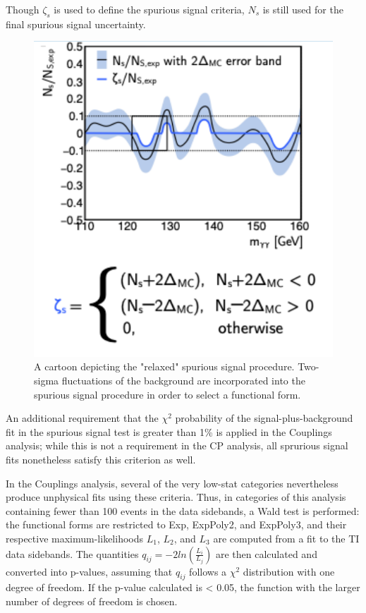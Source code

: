 Though $\zeta_{s}$ is used to define the spurious signal criteria, $N_{s}$ is still used for the final spurious signal uncertainty. 

\begin{figure}
\includegraphics[width=\linewidth]{figures/sigbkgparam/SSRelaxed.png}
\caption{A cartoon depicting the "relaxed" spurious signal procedure. Two-sigma fluctuations of the background are incorporated into the spurious signal procedure in order to select a functional form.}
\label{fig:SSrelaxed}
\end{figure} 


An additional requirement that the $\chi^{2}$ probability of the signal-plus-background fit in the spurious signal test is greater than 1\% is applied in the Couplings analysis; while this is not a requirement in the CP analysis, all sprurious signal fits nonetheless satisfy this criterion as well.

In the Couplings analysis, several of the very low-stat categories nevertheless produce unphysical fits using these criteria. Thus, in categories of this analysis containing fewer than 100 events in the data sidebands, a Wald test is performed: the functional forms are restricted to Exp, ExpPoly2, and ExpPoly3, and their respective maximum-likelihoods $L_{1}$, $L_{2}$, and $L_{3}$ are computed from a fit to the TI data sidebands. The quantities $q_{ij} = -2 ln(\frac{L_{i}}{L_{j}})$ are then calculated and converted into p-values, assuming that $q_{ij}$ follows a $\chi^{2}$ distribution with one degree of freedom. If the p-value calculated is < 0.05, the function with the larger number of degrees of freedom is chosen. 

